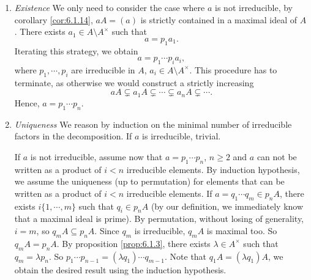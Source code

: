 \begin{proofenv}
    \begin{enumerate}
        \item \textit{Existence}
            We only need to consider the case where $a$ is not irreducible, by corollary \ref{cor:6.1.14},
            $aA = (a)$ is strictly contained in a maximal ideal of $A$.
            There exists $a_1 \in A \setminus A^\times$ such that
            $$a = p_1 a_1.$$
            Iterating this strategy, we obtain
            $$a = p_1 \cdots p_i a_i,$$
            where $p_1,\cdots, p_i$ are irreducible in $A$, $a_i \in A \setminus A^\times$.
            This procedure has to terminate, as otherwise we would construct a strictly increasing
            $$aA \subsetneq a_1 A \subsetneq \cdots \subsetneq a_n A \subsetneq \cdots.$$
            Hence, $a = p_1 \cdots p_n$.
        \item \textit{Uniqueness}
            We reason by induction on the minimal number of irreducible factors in the decomposition.
            If $a$ is irreducible, trivial.

            \quad If $a$ is not irreducible,
            assume now that $a = p_1 \cdots p_n$, $n \ge 2$ and $a$ can not be written as a product of $i < n$ irreducible elements.
            By induction hypothesis,
            we assume the uniqueness (up to permutation) for elements that can be written as a product of $i < n$ irreducible elements.
            If $a = q_1 \cdots q_m \in p_n A$,
            there exists $i\{1,\cdots,m\}$ such that $q_i \in p_n A$ (by our definition, we immediately know that a maximal ideal is prime).
            By permutation, without losing of generality, $i = m$, so $q_m A \subseteq p_n A$.
            Since $q_m$ is irreducible, $q_m A$ is maximal too.
            So $q_m A = p_n A$.
            By proposition \ref{prop:6.1.3},
            there exists $\lambda \in A^\times$ such that $q_m = \lambda p_n$.
            So $p_1\cdots p_{n-1} = (\lambda q_1) \cdots q_{m-1}.$
            Note that $q_1 A = (\lambda q_1) A$,
            we obtain the desired result using the induction hypothesis.
    \end{enumerate}
\end{proofenv}

